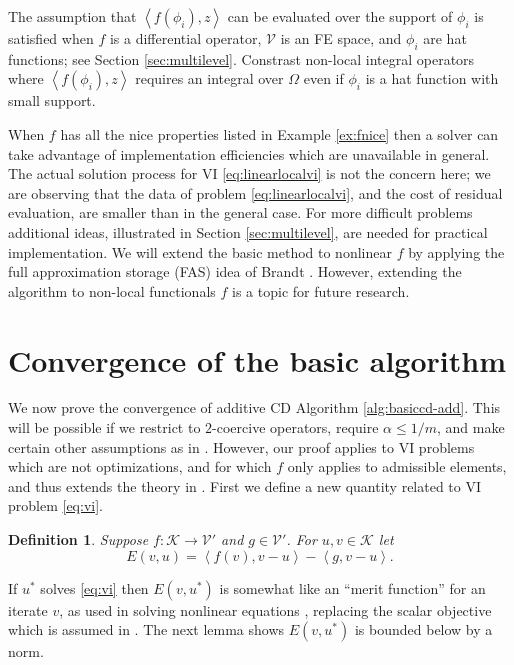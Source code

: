 \documentclass[letterpaper,final,12pt,reqno]{amsart}
\theoremstyle{cstyle}
\theoremstyle{cstyle*}
\theoremstyle{dstyle}
\newtheorem{definition}[theorem]{Definition}
\numberwithin{equation}{section}
\numberwithin{figure}{section}
\numberwithin{table}{section}
\numberwithin{theorem}{section}
\newcommand{\cK}{\mathcal{K}}
\newcommand{\cV}{\mathcal{V}}
\newcommand{\ip}[2]{\left<#1,#2\right>}
\begin{document}
The assumption that $\ip{f(\phi_i)}{z}$ can be evaluated over the support of $\phi_i$ is satisfied when $f$ is a differential operator, $\cV$ is an FE space, and $\phi_i$ are hat functions; see Section \ref{sec:multilevel}.  Constrast non-local integral operators where $\ip{f(\phi_i)}{z}$ requires an integral over $\Omega$ even if $\phi_i$ is a hat function with small support.

When $f$ has all the nice properties listed in Example \ref{ex:fnice} then a solver can take advantage of implementation efficiencies which are unavailable in general.  The actual solution process for VI \eqref{eq:linearlocalvi} is not the concern here; we are observing that the data of problem \eqref{eq:linearlocalvi}, and the cost of residual evaluation, are smaller than in the general case.  For more difficult problems additional ideas, illustrated in Section \ref{sec:multilevel}, are needed for practical implementation.  We will extend the basic method to nonlinear $f$ by applying the full approximation storage (FAS) idea of Brandt \cite{Brandt1977}.  However, extending the algorithm to non-local functionals $f$ is a topic for future research.


\section{Convergence of the basic algorithm} \label{sec:convergence}

We now prove the convergence of additive CD Algorithm \ref{alg:basiccd-add}. %
This will be possible if we restrict to $2$-coercive operators, require $\alpha \le 1/m$, and make certain other assumptions as in \cite{Tai2003}.  However, our proof applies to VI problems which are not optimizations, and for which $f$ only applies to admissible elements, and thus extends the theory in \cite{Tai2003}.  First we define a new quantity related to VI problem \eqref{eq:vi}.

\begin{definition} Suppose $f:\cK \to \cV'$ and $g \in \cV'$.  For $u,v \in \cK$ let
\begin{equation}
  E(v,u) = \ip{f(v)}{v-u} - \ip{g}{v-u}.  \label{eq:normlikedefn}
\end{equation}
\end{definition}

If $u^*$ solves \eqref{eq:vi} then $E(v,u^*)$ is somewhat like an ``merit function'' for an iterate $v$, as used in solving nonlinear equations \cite{NocedalWright2006}, replacing the scalar objective which is assumed in \cite{Tai2003}.  The next lemma shows $E(v,u^*)$ is bounded below by a norm.
\end{document}
